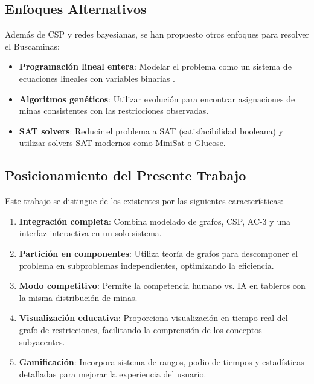 \documentclass[12pt,a4paper]{article}
\begin{document}
\subsection{Enfoques Alternativos}

Además de CSP y redes bayesianas, se han propuesto otros enfoques para resolver el Buscaminas:

\begin{itemize}[itemsep=2pt]
    \item \textbf{Programación lineal entera}: Modelar el problema como un sistema de ecuaciones lineales con variables binarias \cite{adamatzky2005minesweeper}.
    \item \textbf{Algoritmos genéticos}: Utilizar evolución para encontrar asignaciones de minas consistentes con las restricciones observadas.
    \item \textbf{SAT solvers}: Reducir el problema a SAT (satisfacibilidad booleana) y utilizar solvers SAT modernos como MiniSat o Glucose.
\end{itemize}

\subsection{Posicionamiento del Presente Trabajo}

Este trabajo se distingue de los existentes por las siguientes características:

\begin{enumerate}[itemsep=2pt]
    \item \textbf{Integración completa}: Combina modelado de grafos, CSP, AC-3 y una interfaz interactiva en un solo sistema.
    \item \textbf{Partición en componentes}: Utiliza teoría de grafos para descomponer el problema en subproblemas independientes, optimizando la eficiencia.
    \item \textbf{Modo competitivo}: Permite la competencia humano vs. IA en tableros con la misma distribución de minas.
    \item \textbf{Visualización educativa}: Proporciona visualización en tiempo real del grafo de restricciones, facilitando la comprensión de los conceptos subyacentes.
    \item \textbf{Gamificación}: Incorpora sistema de rangos, podio de tiempos y estadísticas detalladas para mejorar la experiencia del usuario.
\end{enumerate}

\end{document}
